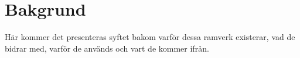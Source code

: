 \section{Bakgrund}
\label{sec:axel-background}

Här kommer det presenteras syftet bakom varför dessa ramverk existerar, vad de bidrar med, varför de används och vart de kommer ifrån. 
